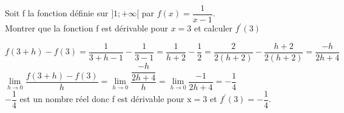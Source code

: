 \documentclass[12pt,a4paper]{article}  %
\begin{document}
\newpage
{}
Soit f la fonction définie sur $] 1 ;+\infty[$ par $f(x)=\dfrac{1}{x-1}$.\\
Montrer que la fonction f est dérivable pour $x=3$ et calculer $f^{\prime}(3)$
\begin{corrBox}
	$f(3+h)-f(3)=\dfrac{1}{3+h-1}-\dfrac{1}{3-1}=\dfrac{1}{h+2}-\dfrac{1}{2}=\dfrac{2}{2(h+2)}-\dfrac{h+2}{2(h+2)}=\dfrac{-h}{2h+4}$\\
	$\lim\limits_{h \rightarrow 0} \dfrac{f(3+h)-f(3)}{h}=\lim\limits_{h \rightarrow 0} \dfrac{\dfrac{-h}{2h+4}}{h}=\lim\limits_{h \rightarrow 0} \dfrac{-1}{2h+4}=-\dfrac{1}{4}$\\
	$-\dfrac{1}{4}$ est un nombre réel donc f est dérivable pour $\mathrm{x}=3$ et $f^{\prime}(3)=-\dfrac{1}{4}$.
\end{corrBox}
\end{document}
